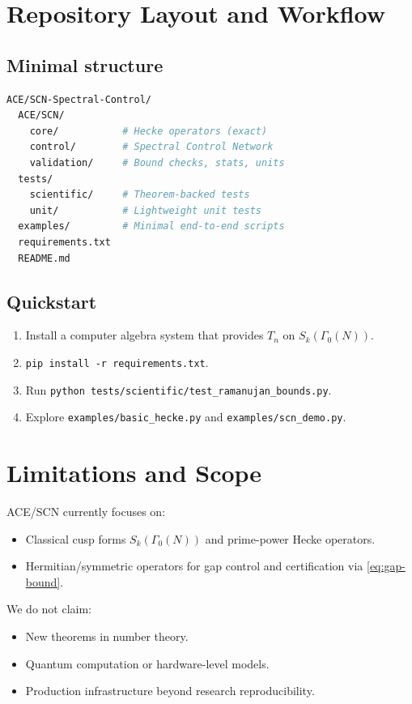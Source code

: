 \documentclass[11pt]{article}
\theoremstyle{definition}
\theoremstyle{remark}
\begin{document}
\section{Repository Layout and Workflow}
\label{sec:repo}

\subsection{Minimal structure}
\begin{lstlisting}[language=bash,caption={Directory layout.}]
ACE/SCN-Spectral-Control/
  ACE/SCN/
    core/           # Hecke operators (exact)
    control/        # Spectral Control Network
    validation/     # Bound checks, stats, units
  tests/
    scientific/     # Theorem-backed tests
    unit/           # Lightweight unit tests
  examples/         # Minimal end-to-end scripts
  requirements.txt
  README.md
\end{lstlisting}

\subsection{Quickstart}
\begin{enumerate}[leftmargin=*,itemsep=2pt]
  \item Install a computer algebra system that provides \(T_n\) on \(S_k(\Gamma_0(N))\).
  \item \texttt{pip install -r requirements.txt}.
  \item Run \texttt{python tests/scientific/test\_ramanujan\_bounds.py}.
  \item Explore \texttt{examples/basic\_hecke.py} and \texttt{examples/scn\_demo.py}.
\end{enumerate}

\section{Limitations and Scope}
\label{sec:limitations}
ACE/SCN currently focuses on:
\begin{itemize}[leftmargin=*,itemsep=2pt]
  \item Classical cusp forms \(S_k(\Gamma_0(N))\) and prime-power Hecke operators.
  \item Hermitian/symmetric operators for gap control and certification via \eqref{eq:gap-bound}.
\end{itemize}
We do not claim:
\begin{itemize}[leftmargin=*,itemsep=2pt]
  \item New theorems in number theory.
  \item Quantum computation or hardware-level models.
  \item Production infrastructure beyond research reproducibility.
\end{itemize}
\end{document}
